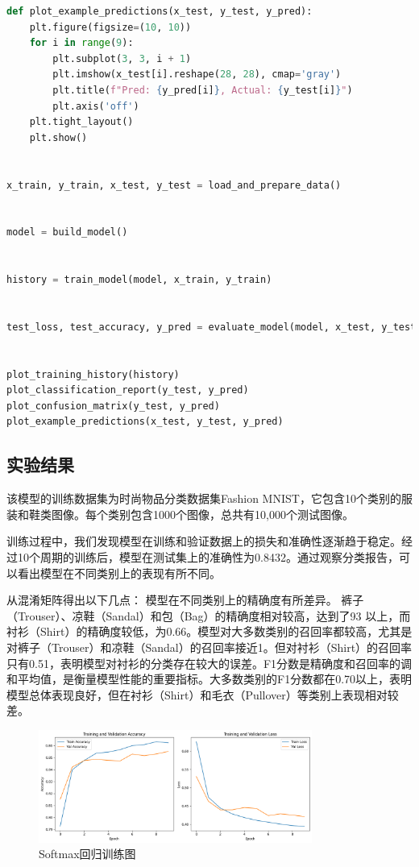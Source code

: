 \documentclass[a4paper,12pt]{article}
\begin{document}
\begin{lstlisting}[language=Python, caption=Softmax回归模型Python代码]
def plot_example_predictions(x_test, y_test, y_pred):
	plt.figure(figsize=(10, 10))
	for i in range(9):
		plt.subplot(3, 3, i + 1)
		plt.imshow(x_test[i].reshape(28, 28), cmap='gray')
		plt.title(f"Pred: {y_pred[i]}, Actual: {y_test[i]}")
		plt.axis('off')
	plt.tight_layout()
	plt.show()


x_train, y_train, x_test, y_test = load_and_prepare_data()


model = build_model()


history = train_model(model, x_train, y_train)


test_loss, test_accuracy, y_pred = evaluate_model(model, x_test, y_test)


plot_training_history(history)
plot_classification_report(y_test, y_pred)
plot_confusion_matrix(y_test, y_pred)
plot_example_predictions(x_test, y_test, y_pred)
\end{lstlisting}


\subsection{实验结果}
该模型的训练数据集为时尚物品分类数据集Fashion MNIST，它包含10个类别的服装和鞋类图像。每个类别包含1000个图像，总共有10,000个测试图像。

训练过程中，我们发现模型在训练和验证数据上的损失和准确性逐渐趋于稳定。经过10个周期的训练后，模型在测试集上的准确性为0.8432。通过观察分类报告，可以看出模型在不同类别上的表现有所不同。

从混淆矩阵得出以下几点：
模型在不同类别上的精确度有所差异。
裤子（Trouser）、凉鞋（Sandal）和包（Bag）的精确度相对较高，达到了93%
以上，而衬衫（Shirt）的精确度较低，为0.66。模型对大多数类别的召回率都较高，尤其是对裤子（Trouser）和凉鞋（Sandal）的召回率接近1。但对衬衫（Shirt）的召回率只有0.51，表明模型对衬衫的分类存在较大的误差。F1分数是精确度和召回率的调和平均值，是衡量模型性能的重要指标。大多数类别的F1分数都在0.70以上，表明模型总体表现良好，但在衬衫（Shirt）和毛衣（Pullover）等类别上表现相对较差。
\begin{figure}[htbp]
	\centering
	\includegraphics[width=0.8\textwidth]{2.png}
	\caption{Softmax回归训练图}
\end{figure}
\end{document}

